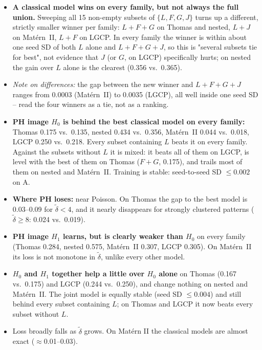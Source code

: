 \documentclass[10pt,a4paper]{article}
\newcommand{\dtil}{\tilde\delta}
\begin{document}
\begin{itemize}
  \item \textbf{A classical model wins on every family, but not always the full union.} Sweeping all 15 non-empty subsets of $\{L,F,G,J\}$ turns up a different, strictly smaller winner per family: $L{+}F{+}G$ on Thomas and nested, $L{+}J$ on Mat\'ern~II, $L{+}F$ on LGCP. In every family the winner is within about one seed SD of both $L$ alone and $L{+}F{+}G{+}J$, so this is "several subsets tie for best", not evidence that $J$ (or $G$, on LGCP) specifically hurts; on nested the gain over $L$ alone is the clearest (0.356 vs.\ 0.365).
  \item \textit{Note on differences:} the gap between the new winner and $L{+}F{+}G{+}J$ ranges from 0.0003 (Mat\'ern~II) to 0.0035 (LGCP), all well inside one seed SD -- read the four winners as a tie, not as a ranking.
  \item \textbf{PH image $H_0$ is behind the best classical model on every family:} Thomas 0.175 vs.\ 0.135, nested 0.434 vs.\ 0.356, Mat\'ern~II 0.044 vs.\ 0.018, LGCP 0.250 vs.\ 0.218. Every subset containing $L$ beats it on every family. Against the subsets without $L$ it is mixed: it beats all of them on LGCP, is level with the best of them on Thomas ($F{+}G$, 0.175), and trails most of them on nested and Mat\'ern~II. Training is stable: seed-to-seed SD $\le 0.002$ on A.
  \item \textbf{Where PH loses:} near Poisson. On Thomas the gap to the best model is 0.03--0.09 for $\dtil < 4$, and it nearly disappears for strongly clustered patterns ($\dtil \ge 8$: 0.024 vs.\ 0.019).
  \item \textbf{PH image $H_1$ learns, but is clearly weaker than $H_0$} on every family (Thomas 0.284, nested 0.575, Mat\'ern~II 0.307, LGCP 0.305). On Mat\'ern~II its loss is not monotone in $\dtil$, unlike every other model.
  \item \textbf{$H_0$ and $H_1$ together help a little over $H_0$ alone} on Thomas (0.167 vs.\ 0.175) and LGCP (0.244 vs.\ 0.250), and change nothing on nested and Mat\'ern~II. The joint model is equally stable (seed SD $\le 0.004$) and still behind every subset containing $L$; on Thomas and LGCP it now beats every subset without $L$.
  \item Loss broadly falls as $\dtil$ grows. On Mat\'ern II the classical models are almost exact ($\approx$0.01--0.03).
\end{itemize}

\end{document}
